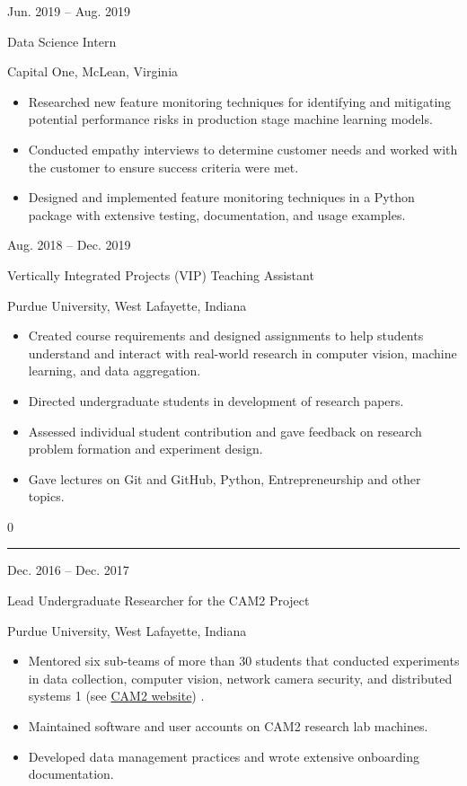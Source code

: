 \documentclass[10pt]{article}
\newlength{\cvcolumngapwidth}
\newlength{\cvleftcolumnwidth}
\newlength{\cvrightcolumnwidth}
\newcommand{\cvsectionstyle}[1]{{\normalsize\cvsectionfont\textcolor{cvsectioncolor}{#1}}}
\newcommand{\cvtitlestyle}[1]{{\large\cvtitlefont\textcolor{cvtitlecolor}{#1}}}
\newcommand{\cvdurationstyle}[1]{{\small\cvdurationfont\textcolor{cvdurationcolor}{#1}}}
\newlength{\cvafteritemskipamount}
\newlength{\cvaftersectionskipamount}
\newlength{\cvparskip}
\newcommand{\cvsection}[1]{
    \begin{minipage}[t]{\cvleftcolumnwidth}
        \raggedleft\cvsectionstyle{#1}
    \end{minipage}%
    \hspace{\cvcolumngapwidth}%
    \begin{minipage}[t]{\cvrightcolumnwidth}
        \textcolor{cvrulecolor}{\rule{\cvrightcolumnwidth}{0.3mm}}
    \end{minipage}

    \vspace{\cvaftersectionskipamount}
}
\newcommand{\cvitem}[2]{
    \begin{minipage}[t]{\cvleftcolumnwidth}
        \raggedleft #1
    \end{minipage}%
    \hspace{\cvcolumngapwidth}%
    \begin{minipage}[t]{\cvrightcolumnwidth}
        \setlength{\parskip}{\cvparskip} #2
    \end{minipage}

    \vspace{\cvafteritemskipamount}
}
\newcommand{\cvtitle}[1]{
    \cvtitlestyle{#1}

    \vspace{1mm plus 0.25mm minus 0.25mm}
    \vspace{-\cvparskip}
}
\def\online{1}
\def\cv{0}
\begin{document}
\cvitem{
    \cvdurationstyle{Jun. 2019 -- Aug. 2019}
}{
    \cvtitle{Data Science Intern}

    Capital One, McLean, Virginia

    \begin{itemize}[leftmargin=*]
        \item Researched new feature monitoring techniques for identifying and mitigating potential performance risks in production stage machine learning models.
        \item Conducted empathy interviews to determine customer needs and worked with the customer to ensure success criteria were met.
        \item Designed and implemented feature monitoring techniques in a Python package with extensive testing, documentation, and usage examples.
    \end{itemize}
}

\cvitem{
    \cvdurationstyle{Aug. 2018 -- Dec. 2019}
}{
    \cvtitle{Vertically Integrated Projects (VIP) Teaching Assistant}

    Purdue University, West Lafayette, Indiana

    \begin{itemize}[leftmargin=*]
        \item Created course requirements and designed assignments to help students understand and interact with real-world research in computer vision, machine learning, and data aggregation.
        \item Directed undergraduate students in development of research papers.
        \item Assessed individual student contribution and gave feedback on research problem formation and experiment design.
        \item Gave lectures on Git and GitHub, Python, Entrepreneurship and other topics. 
    \end{itemize}
}

\if\cv0
\else

\cvsection{RESEARCH EXPERIENCE}

\cvitem{
    \cvdurationstyle{Dec. 2016 -- Dec. 2017}
}{
    \cvtitle{Lead Undergraduate Researcher for the CAM2 Project}

    Purdue University, West Lafayette, Indiana

    \begin{itemize}[leftmargin=*]
        \item Mentored six sub-teams of more than 30 students that conducted experiments in data collection, computer vision, network camera security, and distributed systems
        \if\online1
            (see \href{https://www.cam2project.net/}{CAM2 website})
        \fi.
        \item Maintained software and user accounts on CAM2 research lab machines.
        \item Developed data management practices and wrote extensive onboarding documentation.
    \end{itemize}
}
\end{document}
